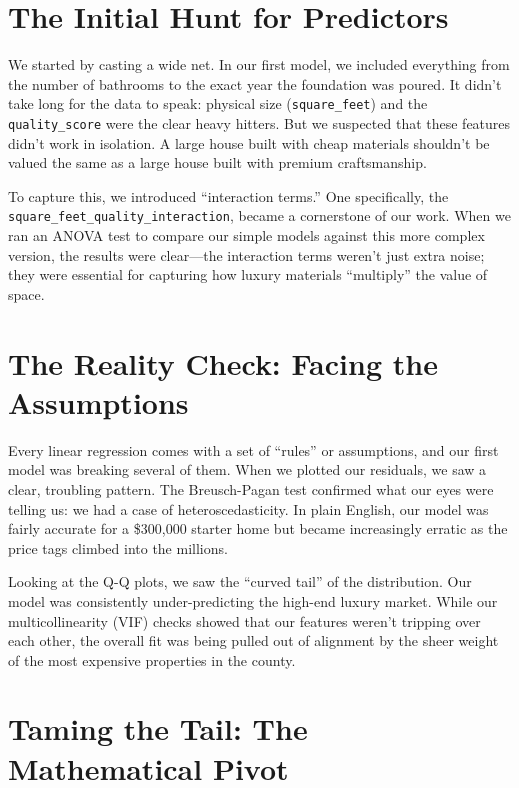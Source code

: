 \documentclass[
  english,
  letterpaper,
  DIV=11,
  numbers=noendperiod]{scrreprt}
\begin{document}
\section{The Initial Hunt for
Predictors}\label{the-initial-hunt-for-predictors}

We started by casting a wide net. In our first model, we included
everything from the number of bathrooms to the exact year the foundation
was poured. It didn't take long for the data to speak: physical size
(\texttt{square\_feet}) and the \texttt{quality\_score} were the clear
heavy hitters. But we suspected that these features didn't work in
isolation. A large house built with cheap materials shouldn't be valued
the same as a large house built with premium craftsmanship.

To capture this, we introduced ``interaction terms.'' One specifically,
the \texttt{square\_feet\_quality\_interaction}, became a cornerstone of
our work. When we ran an ANOVA test to compare our simple models against
this more complex version, the results were clear---the interaction
terms weren't just extra noise; they were essential for capturing how
luxury materials ``multiply'' the value of space.

\section{The Reality Check: Facing the
Assumptions}\label{the-reality-check-facing-the-assumptions}

Every linear regression comes with a set of ``rules'' or assumptions,
and our first model was breaking several of them. When we plotted our
residuals, we saw a clear, troubling pattern. The Breusch-Pagan test
confirmed what our eyes were telling us: we had a case of
heteroscedasticity. In plain English, our model was fairly accurate for
a \$300,000 starter home but became increasingly erratic as the price
tags climbed into the millions.

Looking at the Q-Q plots, we saw the ``curved tail'' of the
distribution. Our model was consistently under-predicting the high-end
luxury market. While our multicollinearity (VIF) checks showed that our
features weren't tripping over each other, the overall fit was being
pulled out of alignment by the sheer weight of the most expensive
properties in the county.

\section{Taming the Tail: The Mathematical
Pivot}\label{taming-the-tail-the-mathematical-pivot}
\end{document}
